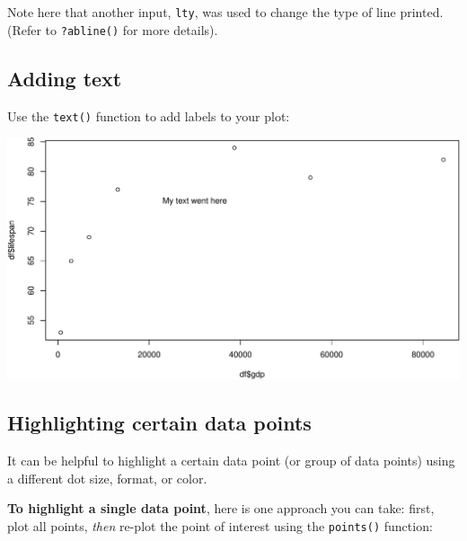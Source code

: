 \documentclass[
]{book}
\newenvironment{Shaded}{\begin{snugshade}}{\end{snugshade}}
\newcommand{\DataTypeTok}[1]{\textcolor[rgb]{0.13,0.29,0.53}{#1}}
\newcommand{\DecValTok}[1]{\textcolor[rgb]{0.00,0.00,0.81}{#1}}
\newcommand{\KeywordTok}[1]{\textcolor[rgb]{0.13,0.29,0.53}{\textbf{#1}}}
\newcommand{\NormalTok}[1]{#1}
\newcommand{\OperatorTok}[1]{\textcolor[rgb]{0.81,0.36,0.00}{\textbf{#1}}}
\newcommand{\StringTok}[1]{\textcolor[rgb]{0.31,0.60,0.02}{#1}}
\begin{document}
Note here that another input, \texttt{lty}, was used to change the type of line printed. (Refer to \texttt{?abline()} for more details).

\hypertarget{adding-text}{%
\subsection*{Adding text}\label{adding-text}}

Use the \texttt{text()} function to add labels to your plot:

\begin{Shaded}
\end{Shaded}

\includegraphics{figures/unnamed-chunk-547-1.pdf}

\hypertarget{highlighting-certain-data-points}{%
\subsection*{Highlighting certain data points}\label{highlighting-certain-data-points}}

It can be helpful to highlight a certain data point (or group of data points) using a different dot size, format, or color.

\textbf{To highlight a single data point}, here is one approach you can take: first, plot all points, \emph{then} re-plot the point of interest using the \texttt{points()} function:
\end{document}
